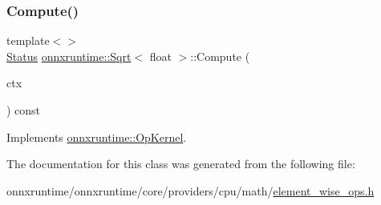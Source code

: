 \subsubsection{\texorpdfstring{Compute()}{Compute()}\hspace{0.1cm}{\footnotesize\ttfamily [2/2]}}
{\footnotesize\ttfamily template$<$$>$ \\
\mbox{\hyperlink{classonnxruntime_1_1common_1_1Status}{Status}} \mbox{\hyperlink{classonnxruntime_1_1Sqrt}{onnxruntime\+::\+Sqrt}}$<$ float $>$\+::Compute (\begin{DoxyParamCaption}\item[{\mbox{\hyperlink{classonnxruntime_1_1OpKernelContext}{Op\+Kernel\+Context}} $\ast$}]{ctx }\end{DoxyParamCaption}) const\hspace{0.3cm}{\ttfamily [virtual]}}



Implements \mbox{\hyperlink{classonnxruntime_1_1OpKernel_a9eca8656a78b1b3ab9d3351a12798650}{onnxruntime\+::\+Op\+Kernel}}.



The documentation for this class was generated from the following file\+:\begin{DoxyCompactItemize}
\item 
onnxruntime/onnxruntime/core/providers/cpu/math/\mbox{\hyperlink{element__wise__ops_8h}{element\+\_\+wise\+\_\+ops.\+h}}\end{DoxyCompactItemize}
